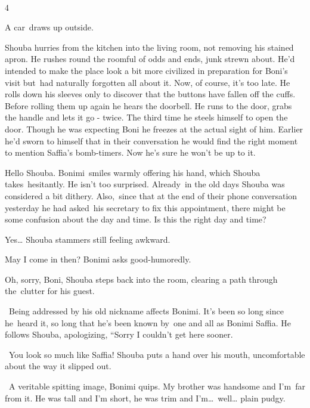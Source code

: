 \documentclass[twoside,11pt]{book}
\begin{document}
~

4

A car~draws up outside.{\ }

Shouba hurries from the kitchen into the living room, not removing his stained apron. He rushes round the roomful of
odds and ends, junk strewn about. He{}'d intended to make the place look a bit more civilized in preparation for Boni's
visit but~had naturally forgotten all about it. Now, of course, it's too late. He rolls down his sleeves only to
discover that the buttons have fallen off the cuffs. Before rolling them up again he hears the doorbell. He runs to the
door, grabs the handle and lets it go - twice. The third time he steels himself to open the door. Though he was
expecting Boni he freezes at the actual sight of him. Earlier he{}'d sworn to himself that in their conversation he
would find the right moment to mention Saffia's bomb-timers. Now he{}'s sure he won't be up to it.

{\textquotedbl}Hello Shouba.{\textquotedbl} Bonimi~smiles warmly offering his hand, which Shouba takes~hesitantly. He
isn't too surprised. Already\ in the old days Shouba was considered a bit dithery.  Also,\ since that at the end of
their phone conversation yesterday he had asked~his secretary to fix this appointment, there might be some confusion
about the day and time. {\textquotedbl}Is this the right day and time?{\textquotedbl} 

{\textquotedbl}Yes{\dots}{\textquotedbl} Shouba stammers still feeling awkward.

{\textquotedbl}May I come in then?{\textquotedbl} Bonimi asks good-humoredly.

{\textquotedbl}Oh, sorry, Boni,{\textquotedbl} Shouba steps back into the room, clearing a path through the~clutter for
his guest. 

~Being addressed by his old nickname affects Bonimi. It's been so long since he~heard it, so long that he's been known
by{\ }one and all as Bonimi Saffia. He follows Shouba, apologizing, ``Sorry I
couldn't get here sooner.{\textquotedbl}

~{\textquotedbl}You look so much like Saffia!{\textquotedbl} Shouba puts a hand over his mouth, uncomfortable about the
way it slipped out.

~{\textquotedbl}A veritable spitting image,{\textquotedbl} Bonimi quips. {\textquotedbl}My brother was handsome and
I'm~far from it. He was tall and I'm short, he was trim and I'm{\dots}\ well{\dots} plain pudgy. {\textquotedbl} 
\end{document}
